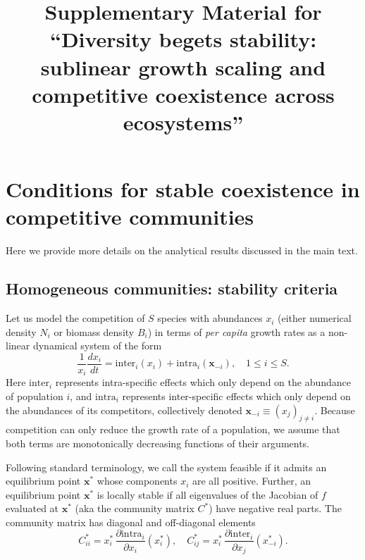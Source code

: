 \documentclass[12pt]{article}
\title{Supplementary Material for ``Diversity begets stability: sublinear growth scaling and competitive coexistence across ecosystems''}
\newcommand{\inter}{\textrm{inter}}
\newcommand{\intra}{\textrm{intra}}
\begin{document}
\appendix

\maketitle




\section{Conditions for stable coexistence in competitive communities}

Here we provide more details on the analytical results discussed in the main text. 

\subsection{Homogeneous communities: stability criteria}


Let us model the competition of $S$ species with abundances $x_i$ (either numerical density $N_i$ or biomass density $B_i$) in terms of \emph{per capita} growth rates as a non-linear dynamical system of the form
\begin{equation}
\frac{1}{x_i}\frac{dx_i}{dt} = \inter_i(x_i) + \intra_i(\mathbf x_{-i}), \quad 1\leq i\leq S .
\end{equation}
Here $\inter_i$ represents intra-specific effects which only depend on the abundance of population $i$, and  $\intra_i$ represents inter-specific effects which only depend on the abundances of its competitors, collectively denoted $\mathbf x_{-i}\equiv (x_j)_{j \neq i}$. Because competition can only reduce the growth rate of a population, we assume that both terms are monotonically decreasing functions of their arguments. 

Following standard terminology, we call the system feasible if it admits an equilibrium point $\mathbf x^*$ whose components $x_i$ are all positive. Further, an equilibrium point $\mathbf x^*$ is locally stable if all eigenvalues of the Jacobian of $f$ evaluated at $\mathbf x^*$ (aka the community matrix $C^*$) have negative real parts. 
The community matrix has diagonal and off-diagonal elements 
\begin{equation}
    C^*_{ii} = x_i^*\, \frac{\partial \intra_i}{\partial x_i}(x_i^*), \quad C^*_{ij} = x_i^*\, \frac{\partial \inter_i}{\partial x_j}(x_{-i}^*).
\end{equation}
\end{document}
